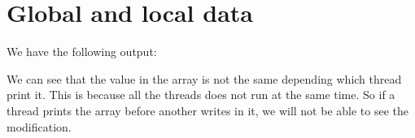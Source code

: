 \chapter{Global and local data}

We have the following output:



We can see that the value in the array is not the same depending which thread print it. This is because all the threads does not run at the same time. So if a thread prints the array before another writes in it, we will not be able to see the modification.
